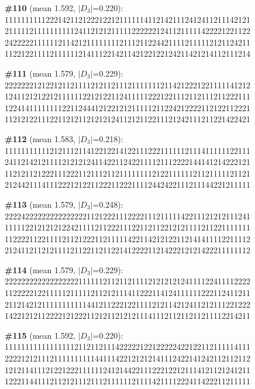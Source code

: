 \documentclass[10pt]{article}
\begin{document}
\noindent\textbf{\#110} (mean 1.592, $|D_3|$=0.220):\\
111111111122214211212221221211111141121421112412411211142121\\
211111211111111112411212121111122222212411211111422221221122\\
242222211111121142121111111121112112244211112111112121124211\\
112212211112111111214111221421142122122124211421214112111214\medskip

\noindent\textbf{\#111} (mean 1.579, $|D_3|$=0.229):\\
222222212122121121111212112111211111112114212221221111141212\\
124112121221211111122121221124111112221221112112111211222111\\
122414111111112211244412122121211111211224212222112122112221\\
112121221112211212112121212411212112211121242111211221422421\medskip

\noindent\textbf{\#112} (mean 1.583, $|D_3|$=0.218):\\
111111111112121112114122122141221112221111112111411111122111\\
241121421211112121212411422112422111121112222144141214222121\\
112121121222111222112111211211111111212211111121121111121121\\
212442111411122212122112221122211112442422111211144221211111\medskip

\noindent\textbf{\#113} (mean 1.579, $|D_3|$=0.248):\\
222242222222222222221121222111222211121111142211121212111241\\
111112212121212242111121122211122112112212121111211221111111\\
112222112211112112122211211111422114212122112141411112211112\\
212411211212111121122112112214122221121422212121422211111112\medskip

\noindent\textbf{\#114} (mean 1.579, $|D_3|$=0.229):\\
222222222222222222111111211211211112121212124111122411112222\\
112222212211111211111211212111411222114124111111222112411211\\
211214212111111111114412112221221111212114212411212111221222\\
142212121122221212221121211212121114111211211211211112214211\medskip

\noindent\textbf{\#115} (mean 1.592, $|D_3|$=0.220):\\
111111111111111112112112111422222122122222422122112111114111\\
222212121112111111111144111422121212141112422141242112112112\\
121211411121221222111111241214422111222122121114121121241211\\
122211441112112121112111211111121111421111222411422211211111\medskip
\end{document}
